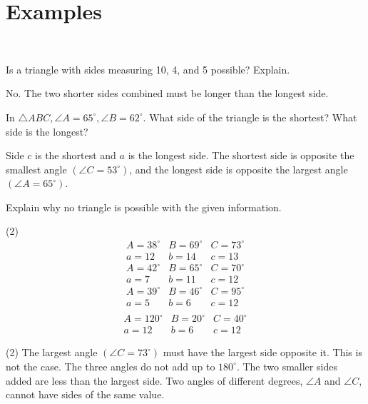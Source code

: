 \documentclass[12pt,fleqn]{book}
\newcommand{\prb}[1]{\begin{Exercise}\parbox[t]{\textwidth-5em}{#1}\end{Exercise}}
\newcommand{\sol}[1]{\begin{Answer}\parbox[t]{\textwidth-5em}{#1}\end{Answer}}
\begin{document}
\section*{Examples}
\clearpage \ 
\clearpage 
\prb{Is a triangle with sides measuring 10, 4, and 5 possible? Explain.}
\sol{No. The two shorter sides combined must be longer than the longest side.}
\prb{In $\triangle A B C, \angle A=65^{\circ}, \angle B=62^{\circ}$. What side of the triangle is the shortest? What side is the longest?}
\sol{Side $c$ is the shortest and $a$ is the longest side. The shortest side is opposite the smallest angle $\left(\angle C=53^{\circ}\right)$, and the longest side is opposite the largest angle $\left(\angle A=65^{\circ}\right)$.}
\prb{
	Explain why no triangle is possible with the given information.
	\begin{tasks}(2)
		\task
		\vspace{-2.2em}
		\[
			\begin{array}{lll}
				A=38^{\circ} & B=69^{\circ} & C=73^{\circ} \\
				a=12         & b=14         & c=13
			\end{array}
		\]
		\vspace{5em}
		\task
		\vspace{-2.2em}
		\[
			\begin{array}{lll}
				A=42^{\circ} & B=65^{\circ} & C=70^{\circ} \\
				a=7          & b=11         & c=12
			\end{array}
		\]
		\vspace{5em}
		\task
		\vspace{-2.2em}
		\[
			\begin{array}{lll}
				A=39^{\circ} & B=46^{\circ} & C=95^{\circ} \\
				a=5          & b=6          & c=12         \\
			\end{array}
		\]
		\vspace{5em}
		\task
		\vspace{-2.2em}
		\[
			\begin{array}{lll}
				A=120^{\circ} & B=20^{\circ} & C=40^{\circ} \\
				a=12          & b=6          & c=12
			\end{array}
		\]
		\vspace{5em}
	\end{tasks}
}
\sol{
	\begin{tasks}(2)
		\task The largest angle $\left(\angle C=73^{\circ}\right)$ must have the largest side opposite it. This is not the case.
		\task The three angles do not add up to $180^{\circ}$.
		\task The two smaller sides added are less than the largest side.
		\task Two angles of different degrees, $\angle A$ and $\angle C$, cannot have sides of the same value.
	\end{tasks}
}
\end{document}
